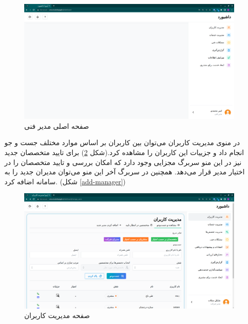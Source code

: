 \begin{figure}[h]
	\centering
	\includegraphics[width=\textwidth]{figs/user-guide/tm-dashboard}
	\caption{صفحه اصلی مدیر فنی}
	\label{tm-dashboard}
\end{figure}

\FloatBarrier

در منوی مدیریت کاربران می‌توان بین کاربران بر اساس موارد مختلف جست و جو انجام داد و جزییات این کاربران را مشاهده کرد.(شکل \ref{manage-users})
برای تایید متخصصان جدید نیز در این منو سربرگ مجزایی وجود دارد که امکان بررسی و تایید متخصصان را در اختیار مدیر قرار می‌دهد.
همچنین در سربرگ آخر این منو می‌توان مدیران جدید را به سامانه اضافه کرد. (شکل \ref{add-manager})

\begin{figure}[h]
	\centering
	\includegraphics[width=\textwidth]{figs/user-guide/cm-manage-users}
	\caption{صفحه مدیریت کاربران}
	\label{manage-users}
\end{figure}

